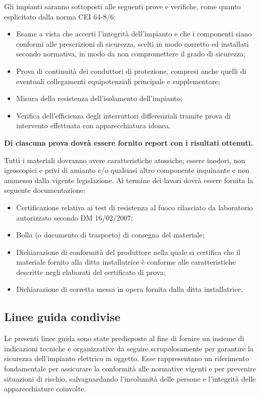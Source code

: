 Gli impianti saranno sottoposti alle seguenti prove e verifiche, come quanto esplicitato dalla norma CEI 64-8/6:

\begin{itemize}
\item Esame a vista che accerti l'integrità dell'impianto e che i componenti siano conformi alle prescrizioni di sicurezza, scelti in modo corretto ed installati secondo normativa, in modo da non compromettere il grado di sicurezza;
\item Prova di continuità dei conduttori di protezione, compresi anche quelli di eventuali collegamenti equipotenziali principale e supplementare;
\item Misura della resistenza dell'isolamento dell'impianto;
\item Verifica dell'efficienza degli interruttori differenziali tramite prova di intervento effettuata con apparecchiatura idonea.
\end{itemize}

\textbf{Di ciascuna prova dovrà essere fornito report con i risultati ottenuti.}

Tutti i materiali dovranno avere caratteristiche atossiche, essere inodori, non igroscopici e privi di amianto e/o qualsiasi altro componente inquinante e non ammesso dalla vigente legislazione.
Al termine dei lavori dovrà essere fornita la seguente documentazione:
\begin{itemize}
    \item Certificazione relativa ai test di resistenza al fuoco rilasciato da laboratorio autorizzato secondo DM 16/02/2007;
    \item Bolla (o documento di trasporto) di consegna del materiale;
    \item Dichiarazione di conformità del produttore nella quale si certifica che il materiale fornito alla ditta installatrice è conforme alle caratteristiche descritte negli elaborati del certificato di prova;
    \item Dichiarazione di corretta messa in opera fornita dalla ditta installatrice.
\end{itemize}


\subsection{Linee guida condivise}
Le presenti linee guida sono state predisposte al fine di fornire un insieme di indicazioni tecniche e organizzative da seguire scrupolosamente per garantire la sicurezza dell’impianto elettrico in oggetto. Esse rappresentano un riferimento fondamentale per assicurare la conformità alle normative vigenti e per prevenire situazioni di rischio, salvaguardando l’incolumità delle persone e l’integrità delle apparecchiature coinvolte.

